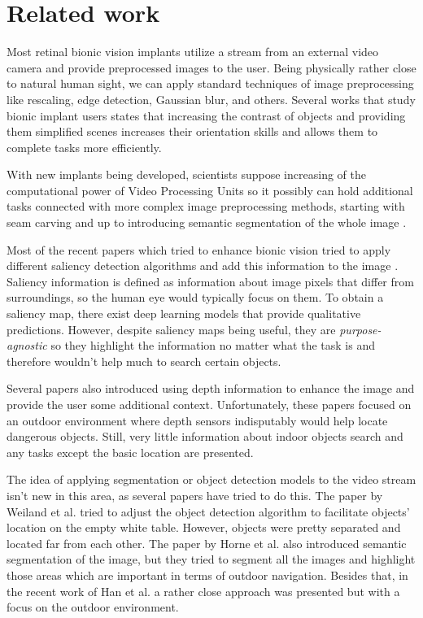 \section{Related work}
Most retinal bionic vision implants utilize a stream from an external video camera and provide preprocessed images to the user. Being physically rather close to natural human sight, we can apply standard techniques of image preprocessing like rescaling, edge detection, Gaussian blur, and others. Several works \cite{AYTON20201383, humayun2009preliminary} that study bionic implant users states that increasing the contrast of objects and providing them simplified scenes increases their orientation skills and allows them to complete tasks more efficiently. 

With new implants being developed, scientists suppose increasing of the computational power of Video Processing Units so it possibly can hold additional tasks connected with more complex image preprocessing methods, starting with seam carving \cite{AlAtabany2010} and up to introducing semantic segmentation of the whole image \cite{HORNE2016113}. 

Most of the recent papers which tried to enhance bionic vision tried to apply different saliency detection algorithms and add this information to the image \cite{LI20171, LI201864, Parikh_2010, 6091267, aor12498}. Saliency information is defined as information about image pixels that differ from surroundings, so the human eye would typically focus on them. To obtain a saliency map, there exist deep learning models \cite{kmmerer2016deepgaze} that provide qualitative predictions. However, despite saliency maps being useful, they are \textit{purpose-agnostic} so they highlight the information no matter what the task is and therefore wouldn't help much to search certain objects. 

Several papers also introduced using depth information \cite{Perez-Yus_2017_ICCV, McCarthy_2014} to enhance the image and provide the user some additional context. Unfortunately, these papers focused on an outdoor environment where depth sensors indisputably would help locate dangerous objects. Still, very little information about indoor objects search and any tasks except the basic location are presented.

The idea of applying segmentation or object detection models to the video stream isn't new in this area, as several papers have tried to do this. The paper by Weiland et al. \cite{6345928} tried to adjust the object detection algorithm to facilitate objects' location on the empty white table. However, objects were pretty separated and located far from each other. The paper by Horne et al. \cite{HORNE2016113} also introduced semantic segmentation of the image, but they tried to segment all the images and highlight those areas which are important in terms of outdoor navigation. Besides that, in the recent work of Han et al. \cite{han2021deep} a rather close approach was presented but with a focus on the outdoor environment. 

